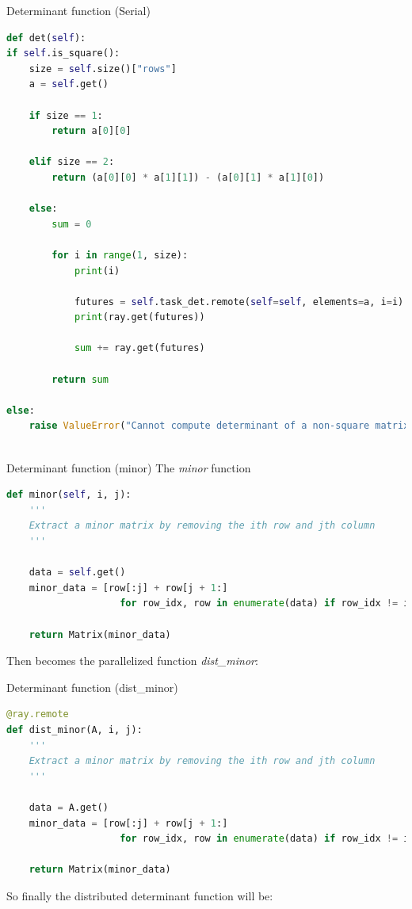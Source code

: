 \documentclass{beamer}
\begin{document}
\begin{frame}[fragile]{Determinant function (Serial)}
    \begin{lstlisting}[language=Python]
def det(self):
if self.is_square():
    size = self.size()["rows"]
    a = self.get()

    if size == 1:
        return a[0][0]

    elif size == 2:
        return (a[0][0] * a[1][1]) - (a[0][1] * a[1][0])

    else:
        sum = 0

        for i in range(1, size):
            print(i)

            futures = self.task_det.remote(self=self, elements=a, i=i)
            print(ray.get(futures))

            sum += ray.get(futures)

        return sum

else:
    raise ValueError("Cannot compute determinant of a non-square matrix")
        
            \end{lstlisting}
\end{frame}

\begin{frame}[fragile]{Determinant function (minor)}
    The \textit{minor} function
    \begin{lstlisting}[language=Python]
    def minor(self, i, j):
    '''
    Extract a minor matrix by removing the ith row and jth column
    '''

    data = self.get()
    minor_data = [row[:j] + row[j + 1:]
                    for row_idx, row in enumerate(data) if row_idx != i]

    return Matrix(minor_data)
\end{lstlisting}
    Then becomes the parallelized function \textit{dist\_minor}:
\end{frame}

\begin{frame}[fragile]{Determinant function (dist\_minor)}
    \begin{lstlisting}[language=Python]
@ray.remote
def dist_minor(A, i, j):
    '''
    Extract a minor matrix by removing the ith row and jth column
    '''

    data = A.get()
    minor_data = [row[:j] + row[j + 1:]
                    for row_idx, row in enumerate(data) if row_idx != i]

    return Matrix(minor_data)
        \end{lstlisting}
    So finally the distributed determinant function will be:
\end{frame}
\end{document}
